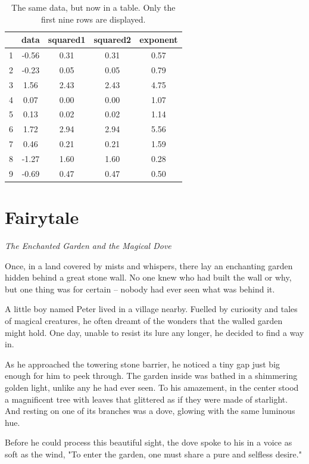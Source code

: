 \documentclass[12pt]{article}
\begin{document}
\begin{table}[!hb]
\centering
\caption{The same data, but now in a table. Only the first nine rows are displayed.}
\begin{tabular}{@{}ccccc@{}}
\toprule
  & data & squared1 & squared2 & exponent \\ \midrule
1 & -0.56 & 0.31 & 0.31 & 0.57 \\
2 & -0.23 & 0.05 & 0.05 & 0.79 \\
3 & 1.56 & 2.43 & 2.43 & 4.75 \\
4 & 0.07 & 0.00 & 0.00 & 1.07 \\
5 & 0.13 & 0.02 & 0.02 & 1.14 \\
6 & 1.72 & 2.94 & 2.94 & 5.56 \\
7 & 0.46 & 0.21 & 0.21 & 1.59 \\
8 & -1.27 & 1.60 & 1.60 & 0.28 \\
9 & -0.69 & 0.47 & 0.47 & 0.50 \\ \bottomrule
\end{tabular}
\end{table}

\section{Fairytale}

\textit{The Enchanted Garden and the Magical Dove}

Once, in a land covered by mists and whispers, there lay an enchanting garden hidden behind a great stone wall. No one knew who had built the wall or why, but one thing was for certain – nobody had ever seen what was behind it.

A little boy named Peter lived in a village nearby. Fuelled by curiosity and tales of magical creatures, he often dreamt of the wonders that the walled garden might hold. One day, unable to resist its lure any longer, he decided to find a way in.

As he approached the towering stone barrier, he noticed a tiny gap just big enough for him to peek through. The garden inside was bathed in a shimmering golden light, unlike any he had ever seen. To his amazement, in the center stood a magnificent tree with leaves that glittered as if they were made of starlight. And resting on one of its branches was a dove, glowing with the same luminous hue.

Before he could process this beautiful sight, the dove spoke to his in a voice as soft as the wind, "To enter the garden, one must share a pure and selfless desire."
\end{document}
